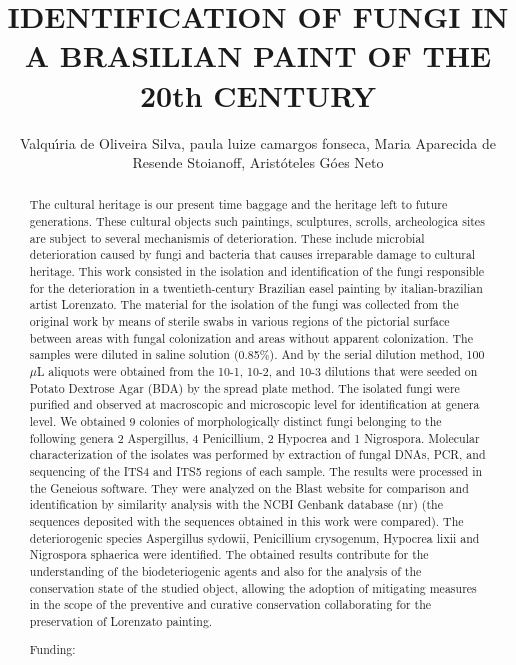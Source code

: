 \documentclass[twoside]{article}
\title{\vspace{-15mm}\fontsize{24pt}{10pt}\selectfont\textbf{ IDENTIFICATION OF FUNGI IN A BRASILIAN PAINT OF THE 20th CENTURY }} %
\author{ Valqu\'{\i}ria de Oliveira Silva, paula  luize camargos fonseca, Maria  Aparecida de Resende Stoianoff, Arist\'oteles G\'oes Neto }
\affil{ Universidade Federal de Minas Gerais }
\date{}
\begin{document}
  
  
  \maketitle %
  
  
  \thispagestyle{fancy} %
  
  
  \begin{abstract}
  The cultural heritage is our present time baggage and the heritage left to future generations. These cultural objects such paintings,  sculptures,  scrolls,  archeologica sites are subject to several mechanismis of deterioration. These include microbial deterioration caused by fungi and bacteria that causes irreparable damage to cultural heritage. This work consisted in the isolation and identification of the fungi responsible for the deterioration in a twentieth-century Brazilian easel painting by italian-brazilian artist Lorenzato. The material for the isolation of the fungi was collected from the original work by means of sterile swabs in various regions of the pictorial surface between areas with fungal colonization and areas without apparent colonization. The samples were diluted in saline solution (0.85\%). And by the serial dilution method,  100$\mu$L aliquots were obtained from the  10-1,  10-2,  and 10-3 dilutions that were seeded on Potato Dextrose Agar (BDA) by the spread plate method. The isolated fungi were purified and observed at macroscopic and microscopic level for identification at genera level. We obtained 9 colonies of morphologically distinct fungi belonging to the following genera 2 Aspergillus,  4 Penicillium,  2 Hypocrea and 1 Nigrospora. Molecular characterization of the isolates was performed by extraction of fungal DNAs,  PCR,  and sequencing of the ITS4 and ITS5 regions of each sample. The results were processed in the Geneious software. They were analyzed on the Blast website for comparison and identification by similarity analysis with the NCBI Genbank database (nr) (the sequences deposited with the sequences obtained in this work were compared). The deteriorogenic species Aspergillus sydowii,  Penicillium crysogenum,  Hypocrea lixii and Nigrospora sphaerica were identified. The obtained results contribute for the understanding of the biodeteriogenic agents and also for the analysis of the conservation state of the studied object,  allowing the adoption of mitigating measures in the scope of the preventive and curative conservation collaborating for the preservation of Lorenzato painting.
  
  Funding:  \\ 
  \end{abstract}
  
\end{document}
